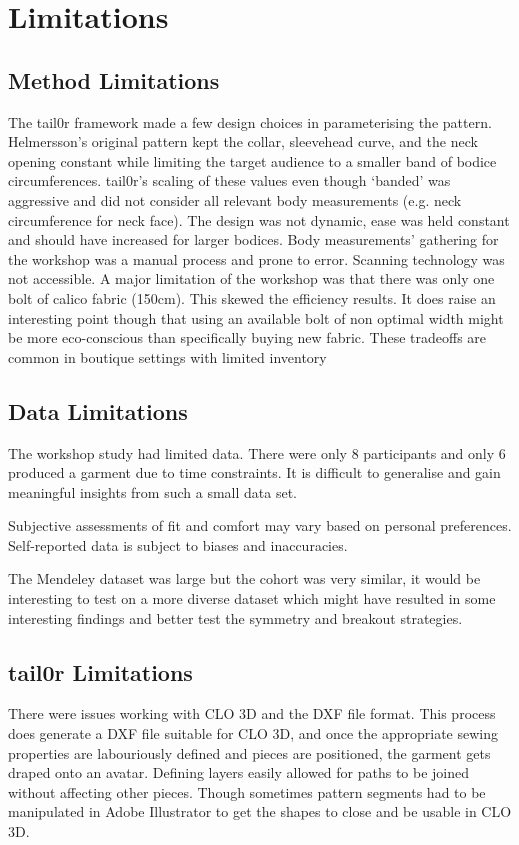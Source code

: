 \section{Limitations}
\subsection{Method Limitations}
The tail0r framework made a few design choices in parameterising the pattern. Helmersson's original pattern kept the collar, sleevehead curve, and the neck opening constant while limiting the target audience to a smaller band of bodice circumferences.
tail0r’s scaling of these values even though ‘banded’ was aggressive and did not consider all relevant body measurements (e.g. neck circumference for neck face). The design was not dynamic, ease was held constant and should have increased for larger bodices.
Body measurements’ gathering for the workshop was a manual process and prone to error. Scanning technology was not accessible. 
A major limitation of the workshop was that there was only one bolt of calico fabric (150cm). This skewed the efficiency results. It does raise an interesting point though that using an available bolt of non optimal width might be more eco-conscious than specifically buying new fabric. These tradeoffs are common in boutique settings with limited inventory

\subsection{Data Limitations}
The workshop study had limited data. There were only 8 participants and only 6 produced a garment due to time constraints. It is difficult to generalise and gain meaningful insights from such a small data set.

Subjective assessments of fit and comfort may vary based on personal preferences. Self-reported data is subject to biases and inaccuracies.

The Mendeley dataset was large but the cohort was very similar, it would be interesting to test on a more diverse dataset which might have resulted in some interesting findings and better test the symmetry and breakout strategies.


\subsection{tail0r Limitations}
There were issues working with CLO 3D and the DXF file format. This process does generate a DXF file suitable for CLO 3D, and once the appropriate sewing properties are labouriously defined and pieces are positioned, the garment gets draped onto an avatar. Defining layers easily allowed for paths to be joined without affecting other pieces. Though sometimes pattern segments had to be manipulated in Adobe Illustrator to get the shapes to close and be usable in CLO 3D. 

